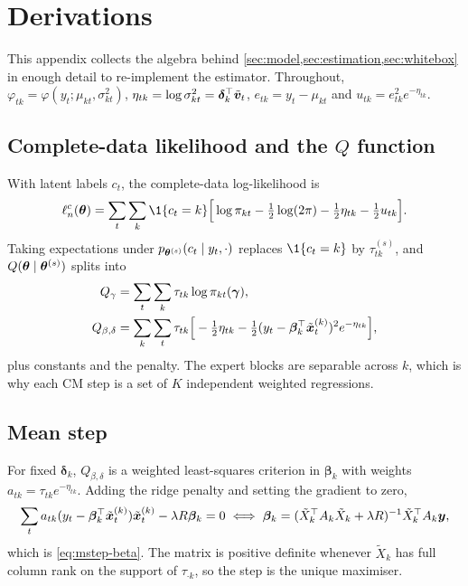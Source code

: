 \section{Derivations}\label{app:derivations}

This appendix collects the algebra behind \cref{sec:model,sec:estimation,sec:whitebox} in enough detail
to re-implement the estimator. Throughout, $\varphi_{tk}=\varphi(y_t;\mu_{kt},\sigma^2_{kt})$,
$\eta_{tk}=\log\sigma^2_{kt}=\bm\delta_k^\top\tilde{\bm{v}}_t$, $e_{tk}=y_t-\mu_{kt}$ and
$u_{tk}=e^2_{tk}e^{-\eta_{tk}}$.

\subsection{Complete-data likelihood and the $Q$ function}
With latent labels $c_t$, the complete-data log-likelihood is
\begin{equation}
\ell^{c}_n(\btheta)=\sum_{t}\sum_k\1\{c_t=k\}\Big[\log\pi_{kt}-\tfrac12\log(2\pi)-\tfrac12\eta_{tk}-\tfrac12u_{tk}\Big].
\end{equation}
Taking expectations under $p_{\bm{\theta}^{(s)}}(c_t\mid y_t,\cdot)$ replaces $\1\{c_t=k\}$ by
$\tau^{(s)}_{tk}$, and $Q(\bm{\theta}\mid\bm{\theta}^{(s)})$ splits into
\begin{align}
Q_\gamma&=\sum_t\sum_k\tau_{tk}\log\pi_{kt}(\bm\gamma),\\
Q_{\beta,\delta}&=\sum_k\sum_t\tau_{tk}\Big[-\tfrac12\eta_{tk}-\tfrac12(y_t-\bm\beta_k^\top\tilde{\bm{x}}^{(k)}_t)^2e^{-\eta_{tk}}\Big],
\end{align}
plus constants and the penalty. The expert blocks are separable across $k$, which is why each CM
step is a set of $K$ independent weighted regressions.

\subsection{Mean step}
For fixed $\bm\delta_k$, $Q_{\beta,\delta}$ is a weighted least-squares criterion in $\bm\beta_k$
with weights $a_{tk}=\tau_{tk}e^{-\eta_{tk}}$. Adding the ridge penalty and setting the gradient to zero,
\[
\sum_ta_{tk}(y_t-\bm\beta_k^\top\tilde{\bm{x}}^{(k)}_t)\tilde{\bm{x}}^{(k)}_t-\lambda R\bm\beta_k=0
\;\Longleftrightarrow\;
\bm\beta_k=(\tilde X_k^\top A_k\tilde X_k+\lambda R)^{-1}\tilde X_k^\top A_k\bm y,
\]
which is \eqref{eq:mstep-beta}. The matrix is positive definite whenever $\tilde X_k$ has full column
rank on the support of $\tau_{\cdot k}$, so the step is the unique maximiser.

